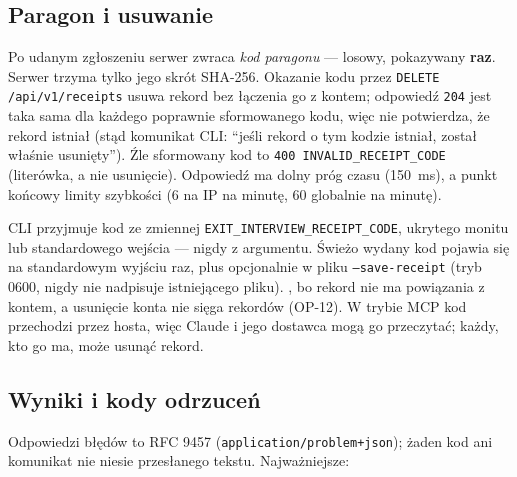 \subsection{Paragon i usuwanie}

Po udanym zgłoszeniu serwer zwraca \emph{kod paragonu} --- losowy, pokazywany
\textbf{raz}. Serwer trzyma tylko jego skrót SHA-256. Okazanie kodu przez
\texttt{DELETE /api/v1/receipts} usuwa rekord bez łączenia go z kontem;
odpowiedź \texttt{204} jest taka sama dla każdego poprawnie sformowanego kodu,
więc nie potwierdza, że rekord istniał (stąd komunikat CLI: ``jeśli rekord
o tym kodzie istniał, został właśnie usunięty''). Źle sformowany kod to
\texttt{400 INVALID\_RECEIPT\_CODE} (literówka, a nie usunięcie). Odpowiedź ma
dolny próg czasu (150~ms), a punkt końcowy limity szybkości (6 na IP na minutę,
60 globalnie na minutę).

CLI przyjmuje kod ze zmiennej \texttt{EXIT\_}\allowbreak\texttt{INTERVIEW\_}\allowbreak\texttt{RECEIPT\_CODE},
ukrytego monitu lub standardowego wejścia --- nigdy z argumentu. Świeżo wydany
kod pojawia się na standardowym wyjściu raz, plus opcjonalnie w pliku
\texttt{--save-receipt} (tryb 0600, nigdy nie nadpisuje istniejącego pliku).
, bo rekord nie ma powiązania z kontem, a usunięcie konta nie sięga
rekordów (OP-12). W trybie MCP kod przechodzi przez hosta, więc Claude i jego
dostawca mogą go przeczytać; każdy, kto go ma, może usunąć rekord.

\subsection{Wyniki i kody odrzuceń}

Odpowiedzi błędów to RFC 9457 (\texttt{application/problem+json}); żaden kod ani
komunikat nie niesie przesłanego tekstu. Najważniejsze:


